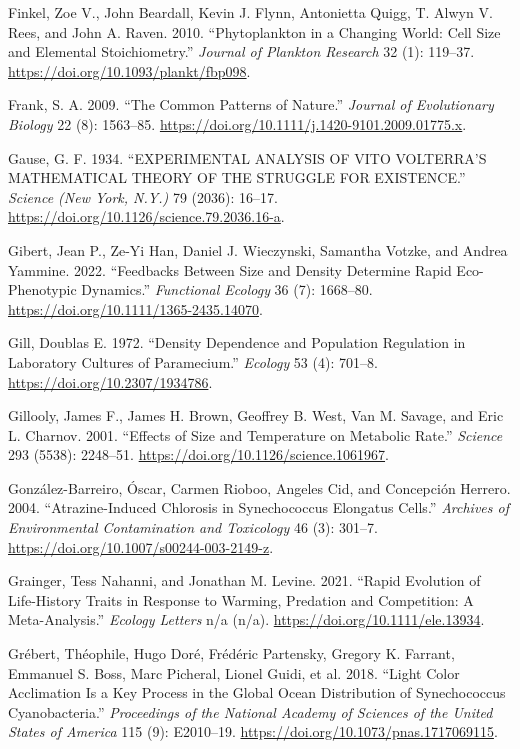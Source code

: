 \documentclass[
  letterpaper,
  DIV=11,
  numbers=noendperiod]{scrartcl}
\newlength{\cslhangindent}
\newenvironment{CSLReferences}[2] %
 {\begin{list}{}{%
  \setlength{\itemindent}{0pt}
  \setlength{\leftmargin}{0pt}
  \setlength{\parsep}{0pt}
  \ifodd #1
   \setlength{\leftmargin}{\cslhangindent}
   \setlength{\itemindent}{-1\cslhangindent}
  \fi
  \setlength{\itemsep}{#2\baselineskip}}}
 {\end{list}}
\begin{document}
\begin{CSLReferences}{1}{0}
Finkel, Zoe V., John Beardall, Kevin J. Flynn, Antonietta Quigg, T.
Alwyn V. Rees, and John A. Raven. 2010. {``Phytoplankton in a Changing
World: {Cell} Size and Elemental Stoichiometry.''} \emph{Journal of
Plankton Research} 32 (1): 119--37.
\url{https://doi.org/10.1093/plankt/fbp098}.

Frank, S. A. 2009. {``The Common Patterns of Nature.''} \emph{Journal of
Evolutionary Biology} 22 (8): 1563--85.
\url{https://doi.org/10.1111/j.1420-9101.2009.01775.x}.

Gause, G. F. 1934. {``{EXPERIMENTAL ANALYSIS OF VITO VOLTERRA}'{S
MATHEMATICAL THEORY OF THE STRUGGLE FOR EXISTENCE}.''} \emph{Science
(New York, N.Y.)} 79 (2036): 16--17.
\url{https://doi.org/10.1126/science.79.2036.16-a}.

Gibert, Jean P., Ze-Yi Han, Daniel J. Wieczynski, Samantha Votzke, and
Andrea Yammine. 2022. {``Feedbacks Between Size and Density Determine
Rapid Eco-Phenotypic Dynamics.''} \emph{Functional Ecology} 36 (7):
1668--80. \url{https://doi.org/10.1111/1365-2435.14070}.

Gill, Doublas E. 1972. {``Density {Dependence} and {Population
Regulation} in {Laboratory Cultures} of {Paramecium}.''} \emph{Ecology}
53 (4): 701--8. \url{https://doi.org/10.2307/1934786}.

Gillooly, James F., James H. Brown, Geoffrey B. West, Van M. Savage, and
Eric L. Charnov. 2001. {``Effects of {Size} and {Temperature} on
{Metabolic Rate}.''} \emph{Science} 293 (5538): 2248--51.
\url{https://doi.org/10.1126/science.1061967}.

González-Barreiro, Óscar, Carmen Rioboo, Angeles Cid, and Concepción
Herrero. 2004. {``Atrazine-{Induced Chlorosis} in {Synechococcus}
Elongatus {Cells}.''} \emph{Archives of Environmental Contamination and
Toxicology} 46 (3): 301--7.
\url{https://doi.org/10.1007/s00244-003-2149-z}.

Grainger, Tess Nahanni, and Jonathan M. Levine. 2021. {``Rapid Evolution
of Life-History Traits in Response to Warming, Predation and
Competition: {A} Meta-Analysis.''} \emph{Ecology Letters} n/a (n/a).
\url{https://doi.org/10.1111/ele.13934}.

Grébert, Théophile, Hugo Doré, Frédéric Partensky, Gregory K. Farrant,
Emmanuel S. Boss, Marc Picheral, Lionel Guidi, et al. 2018. {``Light
Color Acclimation Is a Key Process in the Global Ocean Distribution of
{Synechococcus} Cyanobacteria.''} \emph{Proceedings of the National
Academy of Sciences of the United States of America} 115 (9): E2010--19.
\url{https://doi.org/10.1073/pnas.1717069115}.


\end{CSLReferences}
\end{document}
